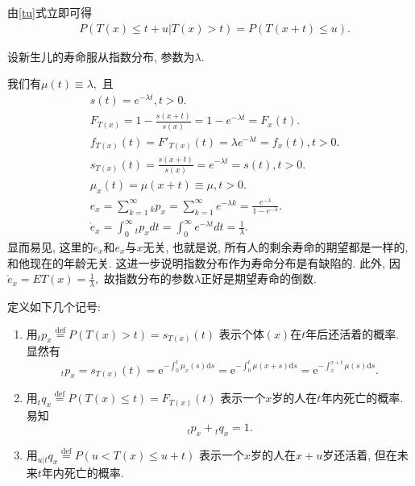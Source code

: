 \documentclass[lang=cn,10pt]{elegantbook}
\begin{document}
\begin{remark}由\eqref{tu}式立即可得
    \begin{align}\label{tul}
         & P(T(x)\leq t+u|T(x)>t)=P(T(x+t)\leq u).
    \end{align}
\end{remark}

\begin{example}
    设新生儿的寿命服从指数分布, 参数为$\lambda$.
\end{example}
\begin{solution}
	我们有$\mu(t)\equiv\lambda,$ 且
    \begin{align*}
         & s(t)=e^{-\lambda t},t>0.                                                                                       \\
         & F_{T(x)}=1-\frac{s(x+t)}{s(x)}=1-e^{- \lambda t}=F_x(t).   \\
         & f_{T(x)}(t)={F'}_{T(x)}(t)=\lambda e^{- \lambda t}=f_x(t),t>0.  \\
         & s_{T(x)}(t)=\frac{s(x+t)}{s(x)}=e^{-\lambda t}=s(t),t>0. \\
         & \mu_x(t)=\mu(x+t)\equiv\mu,t>0. \\
         & e_x = \sum_{k=1}^{\infty} {_kp_x}=\sum_{k=1}^{\infty} {e^{- \lambda k}}=\frac{e^{- \lambda}}{1-e^{- \lambda}}. \\
         & \mathring{e}_x=\int_{0}^{\infty}{_tp_x}dt=\int_{0}^{\infty}{e^{- \lambda t}}dt=\frac{1}{\lambda}.
    \end{align*}
    显而易见, 这里的$\mathring e_x $和$e_x$与$x$无关, 也就是说,  所有人的剩余寿命的期望都是一样的, 和他现在的年龄无关. 这进一步说明指数分布作为寿命分布是有缺陷的.   此外, 因$\mathring{e}_x=ET(x)=\frac{1}{\lambda},$ 故指数分布的参数$\lambda$正好是期望寿命的倒数.
\end{solution}

\begin{proposition}
	定义如下几个记号:
\begin{enumerate}
    \item 用$_tp_{x}\stackrel{\text{def}}{=}P(T(x)>t)=s_{T(x)}(t)$
        表示个体$(x)$在$t$年后还活着的概率. 显然有
        $$ {}_tp_x=s_{T(x)}(t)=\mathrm{e}^{-\int_{0}^{t}\mu_x(s)\mathrm{d}s}=\mathrm{e}^{-\int_{0}^{t}\mu(x+s)\mathrm{d}s}=\mathrm{e}^{-\int_{x}^{x+t}\mu(s)\mathrm{d}s}.$$
    \item 用$_tq_{x}\stackrel{\text{def}}{=}P(T(x)\leq t)=F_{T(x)}(t)$
        表示一个$x$岁的人在$t$年内死亡的概率. 易知
        $$_tp_{x}+{}_tq_{x}=1.$$
    \item 用$ _{u|t}q_x\stackrel{\text{def}}{=}P(u<T(x)\leq u+t)$
        表示一个$x$岁的人在$x+u$岁还活着, 但在未来$t$年内死亡的概率.
\end{enumerate}
\end{proposition}
\end{document}
